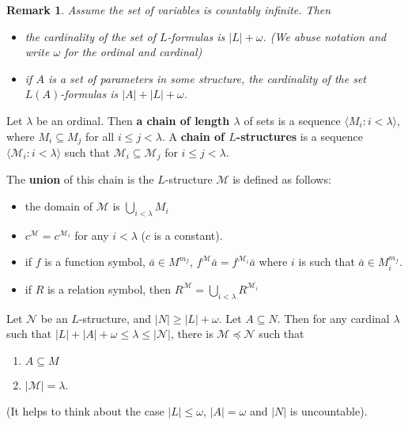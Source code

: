 \documentclass{article}
\newtheorem{nremark}[nthm]{Remark}
\begin{document}
\begin{nremark}\label{rem:3.9}
  Assume the set of variables is countably infinite. Then
  \begin{itemize}[label=--]
    \item the cardinality of the set of $L$-formulas is $|L| + \omega$. (We abuse notation and write $\omega$ for the ordinal and cardinal)
    \item if $A$ is a set of parameters in some structure, the cardinality of the set $L(A)$-formulas is $|A| + |L| + \omega$.
  \end{itemize}
\end{nremark}
\begin{ndef}\label{def:3.10}
  Let $\lambda$ be an ordinal. Then \textbf{a chain of length $\lambda$} of sets is a sequence $\langle M_i : i < \lambda \rangle$, where $M_i \subseteq M_j$ for all $i \leq j < \lambda$.
  A \textbf{chain of $L$-structures} is a sequence $\langle \mathcal{M}_i : i < \lambda \rangle$ such that $\mathcal{M}_i \subseteq \mathcal{M}_j$ for $i \leq j < \lambda$.

  The \textbf{union} of this chain is the $L$-structure $\mathcal{M}$ is defined as follows:
  \begin{itemize}[label=--]
    \item the domain of $\mathcal{M}$ is $\bigcup_{i < \lambda} M_i$
    \item $c^\mathcal{M} = c^{\mathcal{M}_i}$ for any $i < \lambda$ ($c$ is a constant).
    \item if $f$ is a function symbol, $\bar{a} \in M^{m_f}$, $f^\mathcal{M}\bar{a} = f^{\mathcal{M}_i} \bar{a}$ where $i$ is such that $\bar{a} \in M_i^{m_f}$.
    \item if $R$ is a relation symbol, then $R^\mathcal{M} = \bigcup_{i < \lambda} R^{\mathcal{M}_i}$
  \end{itemize}
\end{ndef}

\begin{nthm}\label{thm:3.11DLS}
  Let $\mathcal{N}$ be an $L$-structure, and $|N| \geq |L| + \omega$.
  Let $A \subseteq N$.
  Then for any cardinal $\lambda$ such that $|L| + |A| + \omega \leq \lambda \leq |\mathcal{N}|$, there is $\mathcal{M} \preccurlyeq \mathcal{N}$ such that
  \begin{enumerate}[label=(\roman*)]
    \item $A \subseteq M$
    \item $|\mathcal{M}| = \lambda$.
  \end{enumerate}
\end{nthm}
(It helps to think about the case $|L| \leq \omega$, $|A| = \omega$ and $|N|$ is uncountable).
\end{document}
